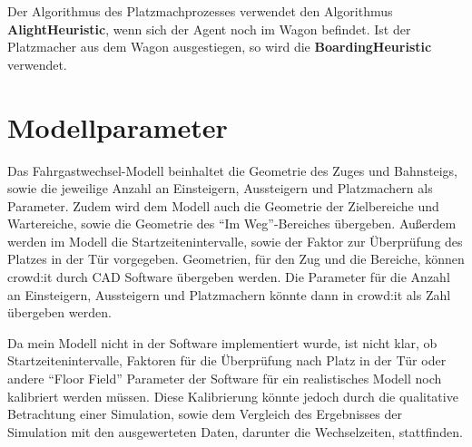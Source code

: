 Der Algorithmus des Platzmachprozesses verwendet den Algorithmus \textbf{AlightHeuristic}, wenn sich der Agent noch im Wagon befindet. Ist der Platzmacher aus dem Wagon ausgestiegen, so wird die \textbf{BoardingHeuristic} verwendet.
\section{Modellparameter} \label{Modellparameter}
Das Fahrgastwechsel-Modell beinhaltet die Geometrie des Zuges und Bahnsteigs, sowie die jeweilige Anzahl an Einsteigern, Aussteigern und Platzmachern als Parameter. Zudem wird dem Modell auch die Geometrie der Zielbereiche und Wartereiche, sowie die Geometrie des "`Im Weg"'-Bereiches übergeben. Außerdem werden im Modell die Startzeitenintervalle, sowie der Faktor zur Überprüfung des Platzes in der Tür vorgegeben. Geometrien, für den Zug und die Bereiche, können crowd:it durch CAD Software übergeben werden. Die Parameter für die Anzahl an Einsteigern, Aussteigern und Platzmachern könnte dann in crowd:it als Zahl übergeben werden. 

Da mein Modell nicht in der Software implementiert wurde, ist nicht klar, ob Startzeitenintervalle, Faktoren für die Überprüfung nach Platz in der Tür oder andere "`Floor Field"' Parameter der Software für ein realistisches Modell noch kalibriert werden müssen. Diese Kalibrierung könnte jedoch durch die qualitative Betrachtung einer Simulation, sowie dem Vergleich des Ergebnisses der Simulation mit den ausgewerteten Daten, darunter die Wechselzeiten, stattfinden.